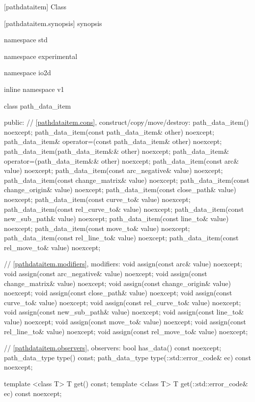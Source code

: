 [pathdataitem] {Class }

 [pathdataitem.synopsis] { synopsis}

\begin{codeblock}
namespace std { namespace experimental { namespace io2d { inline namespace v1 {
  class path_data_item {
  public:
    // \ref{pathdataitem.cons}, construct/copy/move/destroy:
    path_data_item() noexcept;
    path_data_item(const path_data_item& other) noexcept;
    path_data_item& operator=(const path_data_item& other) noexcept;
    path_data_item(path_data_item&& other) noexcept;
    path_data_item& operator=(path_data_item&& other) noexcept;
    path_data_item(const arc& value) noexcept;
    path_data_item(const arc_negative& value) noexcept;
    path_data_item(const change_matrix& value) noexcept;
    path_data_item(const change_origin& value) noexcept;
    path_data_item(const close_path& value) noexcept;
    path_data_item(const curve_to& value) noexcept;
    path_data_item(const rel_curve_to& value) noexcept;
    path_data_item(const new_sub_path& value) noexcept;
    path_data_item(const line_to& value) noexcept;
    path_data_item(const move_to& value) noexcept;
    path_data_item(const rel_line_to& value) noexcept;
    path_data_item(const rel_move_to& value) noexcept;

    // \ref{pathdataitem.modifiers}, modifiers:
    void assign(const arc& value) noexcept;
    void assign(const arc_negative& value) noexcept;
    void assign(const change_matrix& value) noexcept;
    void assign(const change_origin& value) noexcept;
    void assign(const close_path& value) noexcept;
    void assign(const curve_to& value) noexcept;
    void assign(const rel_curve_to& value) noexcept;
    void assign(const new_sub_path& value) noexcept;
    void assign(const line_to& value) noexcept;
    void assign(const move_to& value) noexcept;
    void assign(const rel_line_to& value) noexcept;
    void assign(const rel_move_to& value) noexcept;

    // \ref{pathdataitem.observers}, observers:
    bool has_data() const noexcept;
    path_data_type type() const;
    path_data_type type(::std::error_code& ec) const noexcept;

    template <class T>
    T get() const;
    template <class T>
    T get(::std::error_code& ec) const noexcept;

}}}}}
\end{codeblock}
